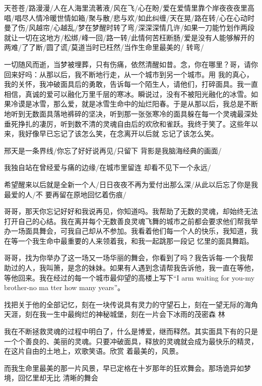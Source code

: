 \documentclass{article}
\begin{document}
天苍苍/路漫漫/人在人海里流著液/风在飞/心在盼/爱在爱情里靠个岸夜夜夜里高唱/唱尽人情冷暖世情如箱/聚与散/悲与欢/如此纠缠/天在晃/路在转/心在心动时曼了伤/风越帘/心越乱/梦在梦醒时转了弯/深深深情几许/如果一刀能竹划作两段就让一切在这地方/松绑/峰一回/路一转/此情何苦枉断肠/爱是没有人能够解开的两难/了了断/圆了谎/莫道当时已枉然/当作生命里最美的/
转弯/ 

一切随风而逝，当梦被埋葬，只有伤痛，依然清醒如昔。念，你在哪里？哥，请你回来好吗：从那以后，我不断地行走，从一个城市到另一个城市。用
\newpage
我的真心，我的关怀，我冲破面具后的勇敢，告诉每一个陌生人，请他们，打碎面具。我一直相信，真诚的爱可以融化万里千层的寒冰。瞬说过，没有不被阳光融化的冰雪。如果冷谟是冰雪，那么爱，就是冰雪生命中的灿烂阳春。于是从那以后，我总是不断地听到无数面具落地裤碎的坚决，听到那一张张寒冷的面具躲在每一个灵魂最深处垂死挣扎的凄厉，听到数不清的灵魂自由后的欢欣和雀跃。我终于笑了。这些年以来，我好像早已忘记了该怎么笑，在念离开以后就
忘记了该怎么笑。 

邢天是一条界线/你忘了好好说再见/只留下
背影是我脑海经典的画面/ 

我独自站在曾经爱与痛的边缘/在城市里留连
却看不见下一个永远/ 

希望醒来以后就是全新一个人/日日夜夜不再为爱付出那么深/从此以后忘了你是我最爱的人/不
要再留在原地回忆着伤痕/ 

\newpage

哥哥，那天你忘记好好和我说再见，你知道吗。我帮助了无数的灵魂，却始终无法打开自己的心结。我在离并每个无数善良灵魂飞舞的城市之前都会要求他们帮我举办一场面具舞会，可我自己却从不参加。我看着他们每一个人的快乐，我知道，我在等一个我生命中最重要的人来领着我，和我一起跳那一段记
忆里的面具舞蹈。 

哥哥，找为你举办了这一场又一场华丽的舞会，你看到了吗？我告诉每-一个我帮助过的人，我叫箫，是念的妹妹。如果有人遇到念请帮我告诉他，我一直在等他，等他回来。我在经过的每一个城市最仰望的高楼上写下“I arm waiting for you-my brother-no ma
tter how many years”。 

找把关于他的全部记忆，刻在一块传说具有灵力的守望石上，刻在一望无际的海角天涯，刻在我一生中最绚烂的神秘城堡，刻在一片会下冰雨的茂密森
林 

\newpage

我在不断拯救灵魂的过程中明白了，什么是博爱，继而释然。其实面具下有的只是一个个善良的、美丽的灵魂。只要冲破面具，释放的灵魂就会成为最快乐的精灵，在这片自由的土地上，欢歌笑语。欣赏
着最美的，风景。 

而我生命里最美的那一片风景，早已定格在十岁那年的狂欢舞会。那场诡异如梦境，回忆里却无比
清晰的舞会 
\end{document}
